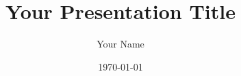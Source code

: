 \documentclass[aspectratio=169]{beamer}
\title{Your Presentation Title}
\author{Your Name}
\institute{EPFL, Switzerland}
\date{\today}
\begin{document}
\begin{frame}
    \titlepage
\end{frame}

\end{document}
